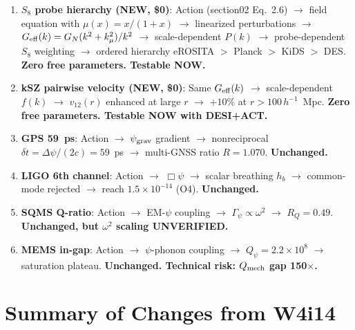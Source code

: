 \documentclass[11pt]{article}
\newcommand{\ee}[1]{\times 10^{#1}}
\newcommand{\Qpsi}{Q_\psi}
\newcommand{\Geff}{G_{\rm eff}}
\begin{document}
\begin{enumerate}
\item \textbf{$S_8$ probe hierarchy (NEW, \$0)}: Action (section02
  Eq.~2.6) $\to$ field equation with $\mu(x)=x/(1+x)$ $\to$ linearized
  perturbations $\to$ $\Geff(k) = G_N(k^2 + k_\mu^2)/k^2$ $\to$
  scale-dependent $P(k)$ $\to$ probe-dependent $S_8$ weighting $\to$
  ordered hierarchy eROSITA $>$ Planck $>$ KiDS $>$ DES.
  \textbf{Zero free parameters. Testable NOW.}

\item \textbf{kSZ pairwise velocity (NEW, \$0)}: Same $\Geff(k)$ $\to$
  scale-dependent $f(k)$ $\to$ $v_{12}(r)$ enhanced at large $r$ $\to$
  $+10\%$ at $r > 100\,h^{-1}$~Mpc.
  \textbf{Zero free parameters. Testable NOW with DESI+ACT.}

\item \textbf{GPS 59~ps}: Action $\to$ $\psi_{\rm grav}$ gradient $\to$
  nonreciprocal $\delta t = \Delta\psi/(2c) = 59$~ps $\to$
  multi-GNSS ratio $R = 1.070$. \textbf{Unchanged.}

\item \textbf{LIGO 6th channel}: Action $\to$ $\Box\psi$ $\to$
  scalar breathing $h_b$ $\to$ common-mode rejected $\to$
  reach $1.5\ee{-14}$ (O4). \textbf{Unchanged.}

\item \textbf{SQMS Q-ratio}: Action $\to$ EM-$\psi$ coupling $\to$
  $\Gamma_\psi \propto \omega^2$ $\to$ $R_Q = 0.49$.
  \textbf{Unchanged, but $\omega^2$ scaling UNVERIFIED.}

\item \textbf{MEMS in-gap}: Action $\to$ $\psi$-phonon coupling $\to$
  $\Qpsi = 2.2\ee{8}$ $\to$ saturation plateau.
  \textbf{Unchanged. Technical risk: $Q_{\rm mech}$ gap 150$\times$.}
\end{enumerate}


\section*{Summary of Changes from W4i14}
\end{document}

